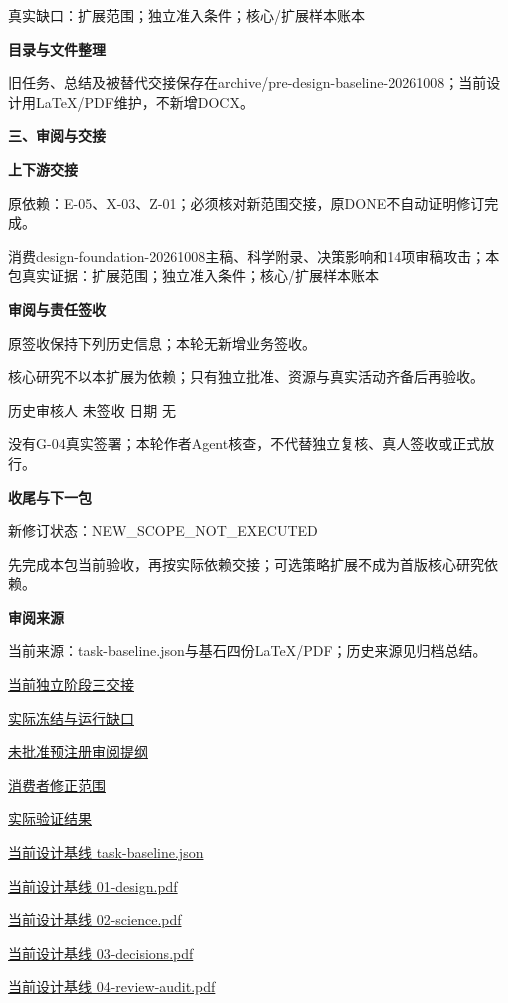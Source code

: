 \documentclass[11pt,a4paper]{article}
\newcommand{\reviewsection}[1]{\par\Needspace{5\baselineskip}\vspace{10pt}\begin{center}{\titlelatin\titlecjk\bfseries\fontsize{14}{20}\selectfont #1}\end{center}}
\newcommand{\reviewsubsection}[1]{\par\Needspace{4\baselineskip}\vspace{4pt}\begin{center}{\titlelatin\titlecjk\bfseries\fontsize{12}{18}\selectfont #1}\end{center}}
\begin{document}
真实缺口：扩展范围；独立准入条件；核心/\allowbreak{}扩展样本账本


\reviewsubsection{2.4 目录与文件整理}
旧任务、总结及被替代交接保存在archive/\allowbreak{}pre-\allowbreak{}design-\allowbreak{}baseline-\allowbreak{}20261008；当前设计用LaTeX/\allowbreak{}PDF维护，不新增DOCX。


\reviewsection{三、审阅与交接}
\reviewsubsection{3.1 上下游交接}
原依赖：E-\allowbreak{}05、X-\allowbreak{}03、Z-\allowbreak{}01；必须核对新范围交接，原DONE不自动证明修订完成。


消费design-\allowbreak{}foundation-\allowbreak{}20261008主稿、科学附录、决策影响和14项审稿攻击；本包真实证据：扩展范围；独立准入条件；核心/\allowbreak{}扩展样本账本


\reviewsubsection{3.2 审阅与责任签收}
原签收保持下列历史信息；本轮无新增业务签收。


核心研究不以本扩展为依赖；只有独立批准、资源与真实活动齐备后再验收。


历史审核人 未签收    日期 无


没有G-\allowbreak{}04真实签署；本轮作者Agent核查，不代替独立复核、真人签收或正式放行。


\reviewsubsection{3.3 收尾与下一包}
新修订状态：NEW\_\allowbreak{}SCOPE\_\allowbreak{}NOT\_\allowbreak{}EXECUTED


先完成本包当前验收，再按实际依赖交接；可选策略扩展不成为首版核心研究依赖。


\reviewsubsection{3.4 审阅来源}
当前来源：task-\allowbreak{}baseline.json与基石四份LaTeX/\allowbreak{}PDF；历史来源见归档总结。


\href{file:///D:/Agent/srp/agent/tasks/G-04/outputs/current-extension.md}{当前独立阶段三交接}


\href{file:///D:/Agent/srp/agent/tasks/G-04/outputs/current-extension.json}{实际冻结与运行缺口}


\href{file:///D:/Agent/srp/agent/tasks/G-04/outputs/preregistration-review-template.json}{未批准预注册审阅提纲}


\href{file:///D:/Agent/srp/agent/tasks/G-04/evidence/consumer-impact.md}{消费者修正范围}


\href{file:///D:/Agent/srp/agent/tasks/G-04/evidence/verification.json}{实际验证结果}


\href{file:///D:/Agent/srp/agent/design/design-foundation-20261008/task-baseline.json}{当前设计基线 task-\allowbreak{}baseline.json}


\href{file:///D:/Agent/srp/agent/design/design-foundation-20261008/01-design.pdf}{当前设计基线 01-\allowbreak{}design.pdf}


\href{file:///D:/Agent/srp/agent/design/design-foundation-20261008/02-science.pdf}{当前设计基线 02-\allowbreak{}science.pdf}


\href{file:///D:/Agent/srp/agent/design/design-foundation-20261008/03-decisions.pdf}{当前设计基线 03-\allowbreak{}decisions.pdf}


\href{file:///D:/Agent/srp/agent/design/design-foundation-20261008/04-review-audit.pdf}{当前设计基线 04-\allowbreak{}review-\allowbreak{}audit.pdf}
\end{document}
